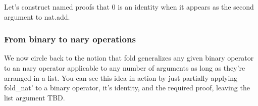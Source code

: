 \documentclass[letterpaper,10pt,english]{sphinxmanual}
\begin{document}
\sphinxAtStartPar
Let’s construct named proofs that 0 is an identity
when it appears as the second argument to nat.add.

\begin{sphinxVerbatim}[commandchars=\\\{\}]
            
 
 \PYG{o}{[}\PYG{o}{]}

     \PYG{o}{[}\PYG{o}{]} 
     \PYG{o}{[}\PYG{o}{]} 
\end{sphinxVerbatim}


\subsubsection{From binary to n\sphinxhyphen{}ary operations}
\label{\detokenize{A_03_Recursive_Types:from-binary-to-n-ary-operations}}
\sphinxAtStartPar
We now circle back to the notion that
fold generalizes any given binary operator to an n\sphinxhyphen{}ary
operator applicable to any number of arguments as long
as they’re arranged in a list. You can see this idea
in action by just partially applying fold\_nat’ to a
binary operator, it’s identity, and the required proof,
leaving the list argument TBD.

\begin{sphinxVerbatim}[commandchars=\\\{\}]
      

  \PYG{o}{[}\PYG{o}{]}            
  \PYG{o}{[}\PYG{o}{]}           
  \PYG{o}{[}\PYG{o}{]}         
  \PYG{o}{[}\PYG{o}{]}   
\end{sphinxVerbatim}
\end{document}
